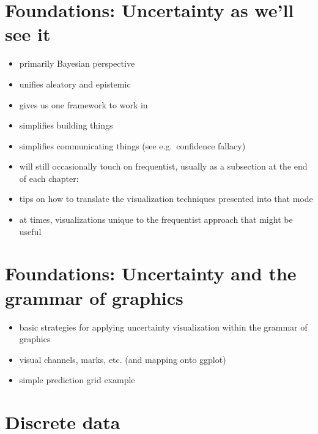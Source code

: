 \documentclass[]{book}
\providecommand{\tightlist}{%
  \setlength{\itemsep}{0pt}\setlength{\parskip}{0pt}}
\theoremstyle{definition}
\theoremstyle{definition}
\theoremstyle{definition}
\theoremstyle{remark}
\begin{document}
\chapter{Foundations: Uncertainty as we'll see it}\label{ch-uncertainty}

\begin{itemize}
\tightlist
\item
  primarily Bayesian perspective
\item
  unifies aleatory and epistemic
\item
  gives us one framework to work in
\item
  simplifies building things
\item
  simplifies communicating things (see e.g.~confidence fallacy)
\item
  will still occasionally touch on frequentist, usually as a subsection
  at the end of each chapter:
\item
  tips on how to translate the visualization techniques presented into
  that mode
\item
  at times, visualizations unique to the frequentist approach that might
  be useful
\end{itemize}

\chapter{Foundations: Uncertainty and the grammar of
graphics}\label{ch-vis-foundations}

\begin{itemize}
\tightlist
\item
  basic strategies for applying uncertainty visualization within the
  grammar of graphics
\item
  visual channels, marks, etc. (and mapping onto ggplot)
\item
  simple prediction grid example
\end{itemize}

\chapter{Discrete data}\label{ch-discrete}
\end{document}
